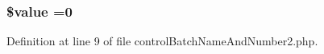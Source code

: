 \hypertarget{control_batch_name_and_number2_8php_a0f298096f322952a72a50f98a74c7b60}{
\subsubsection[{\$value}]{\setlength{\rightskip}{0pt plus 5cm}\$value =0}}\label{control_batch_name_and_number2_8php_a0f298096f322952a72a50f98a74c7b60}


Definition at line 9 of file control\-Batch\-Name\-And\-Number2.\-php.

